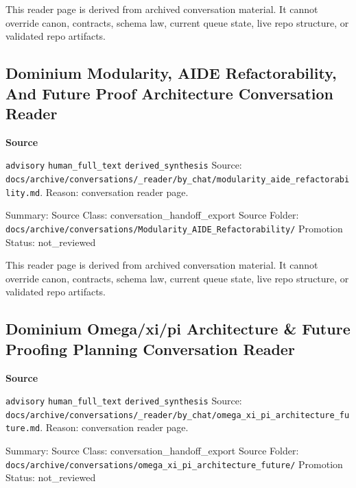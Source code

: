 \documentclass[9pt,a4paper,openany]{book}
\newcommand{\vonecallout}[3]{\par\medskip\noindent\begingroup\setlength{\fboxsep}{7pt}\colorbox{DomCalloutBg}{\parbox{0.94\linewidth}{\textbf{\textcolor{#1}{#2}}\par #3}}\endgroup\par\medskip}
\begin{document}
This reader page is derived from archived conversation material.\allowbreak{} It cannot override canon, contracts, schema law, current queue state, live repo structure, or validated repo artifacts.\allowbreak{}



\subsection{Dominium Modularity, AIDE Refactorability, And Future Proof Architecture Conversation Reader}

\vonecallout{DomSlate}{Source}{\texttt{advisory} \texttt{human\_\allowbreak{}full\_\allowbreak{}text} \texttt{derived\_\allowbreak{}synthesis} Source: \texttt{docs/\allowbreak{}archive/\allowbreak{}conversations/\allowbreak{}\_\allowbreak{}reader/\allowbreak{}by\_\allowbreak{}chat/\allowbreak{}modularity\_\allowbreak{}aide\_\allowbreak{}refactorability.\allowbreak{}md}.\allowbreak{} Reason: conversation reader page.\allowbreak{}}

Summary: Source Class: conversation\_\allowbreak{}handoff\_\allowbreak{}export Source Folder: \texttt{docs/\allowbreak{}archive/\allowbreak{}conversations/\allowbreak{}Modularity\_\allowbreak{}AIDE\_\allowbreak{}Refactorability/\allowbreak{}} Promotion Status: not\_\allowbreak{}reviewed


This reader page is derived from archived conversation material.\allowbreak{} It cannot override canon, contracts, schema law, current queue state, live repo structure, or validated repo artifacts.\allowbreak{}



\subsection{Dominium Omega/xi/pi Architecture \& Future Proofing Planning Conversation Reader}

\vonecallout{DomSlate}{Source}{\texttt{advisory} \texttt{human\_\allowbreak{}full\_\allowbreak{}text} \texttt{derived\_\allowbreak{}synthesis} Source: \texttt{docs/\allowbreak{}archive/\allowbreak{}conversations/\allowbreak{}\_\allowbreak{}reader/\allowbreak{}by\_\allowbreak{}chat/\allowbreak{}omega\_\allowbreak{}xi\_\allowbreak{}pi\_\allowbreak{}architecture\_\allowbreak{}future.\allowbreak{}md}.\allowbreak{} Reason: conversation reader page.\allowbreak{}}

Summary: Source Class: conversation\_\allowbreak{}handoff\_\allowbreak{}export Source Folder: \texttt{docs/\allowbreak{}archive/\allowbreak{}conversations/\allowbreak{}omega\_\allowbreak{}xi\_\allowbreak{}pi\_\allowbreak{}architecture\_\allowbreak{}future/\allowbreak{}} Promotion Status: not\_\allowbreak{}reviewed
\end{document}
